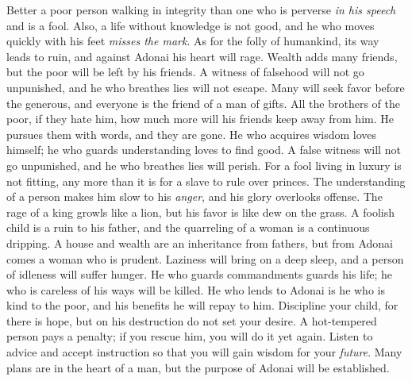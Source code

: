 \begin{biblechapter} %
\verse Better a poor person walking in integrity 
than one who is perverse \textit{in his speech} and is a fool.
\verse Also, a life without knowledge is not good, 
and he who moves quickly with his feet \textit{misses the mark}.
\verse As for the folly of humankind, its way leads to ruin, 
and against Adonai his heart will rage.
\verse Wealth adds many friends, 
but the poor will be left by his friends.
\verse A witness of falsehood will not go unpunished, 
and he who breathes lies will not escape.
\verse Many will seek favor before the generous, 
and everyone is the friend of a man of gifts.
\verse All the brothers of the poor, if they hate him, 
how much more will his friends keep away from him. 
He pursues them with words, and they are gone.
\verse He who acquires wisdom loves himself; 
he who guards understanding loves to find good.
\verse A false witness will not go unpunished, 
and he who breathes lies will perish.
\verse For a fool living in luxury is not fitting, 
any more than it is for a slave to rule over princes.
\verse The understanding of a person makes him slow to his \textit{anger}, 
and his glory overlooks offense.
\verse The rage of a king growls like a lion, 
but his favor is like dew on the grass.
\verse A foolish child is a ruin to his father, 
and the quarreling of a woman is a continuous dripping.
\verse A house and wealth are an inheritance from fathers, 
but from Adonai comes a woman who is prudent.
\verse Laziness will bring on a deep sleep, 
and a person of idleness will suffer hunger.
\verse He who guards commandments guards his life; 
he who is careless of his ways will be killed.
\verse He who lends to Adonai is he who is kind to the poor, 
and his benefits he will repay to him.
\verse Discipline your child, for there is hope, 
but on his destruction do not set your desire.
\verse A hot-tempered person pays a penalty; 
if you rescue him, you will do it yet again.
\verse Listen to advice and accept instruction 
so that you will gain wisdom for your \textit{future}.
\verse Many plans are in the heart of a man, 
but the purpose of Adonai will be established.

\end{biblechapter}
